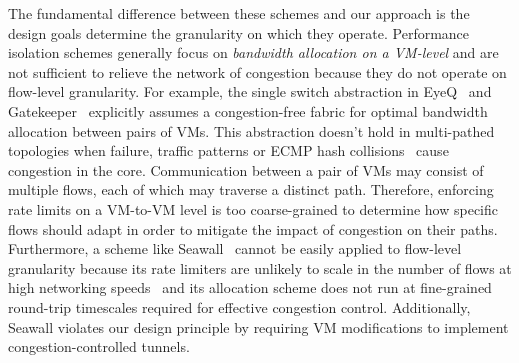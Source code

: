 The fundamental difference between these schemes and our approach is the design
goals determine the granularity on which they operate. 
Performance isolation schemes generally focus on {\em bandwidth allocation on a VM-level} and
are not sufficient to relieve the network of congestion because they do not
operate on flow-level granularity. 
For example, the single switch abstraction
in EyeQ~\cite{jeyakumar2013eyeq} and Gatekeeper~\cite{rodrigues2011gatekeeper} explicitly assumes a congestion-free 
fabric for optimal bandwidth allocation between pairs of VMs. This abstraction doesn't hold in multi-pathed
topologies when failure, traffic patterns or ECMP hash collisions~\cite{hedera} cause congestion in the core.
Communication between a pair of VMs may consist of
multiple flows, each of which may traverse a distinct path. Therefore,
enforcing rate limits on a VM-to-VM level is too coarse-grained to determine how specific flows should adapt in
order to mitigate the impact of congestion on their paths. Furthermore, a scheme like Seawall~\cite{shieh2011sharing}
cannot be easily applied to flow-level granularity because
its rate limiters are unlikely to scale in the number of flows at high networking speeds~\cite{radhakrishnan2014senic}
and its allocation scheme does not run at fine-grained round-trip
timescales required for effective congestion control. Additionally, Seawall violates our design
principle by requiring VM modifications to implement congestion-controlled tunnels.


